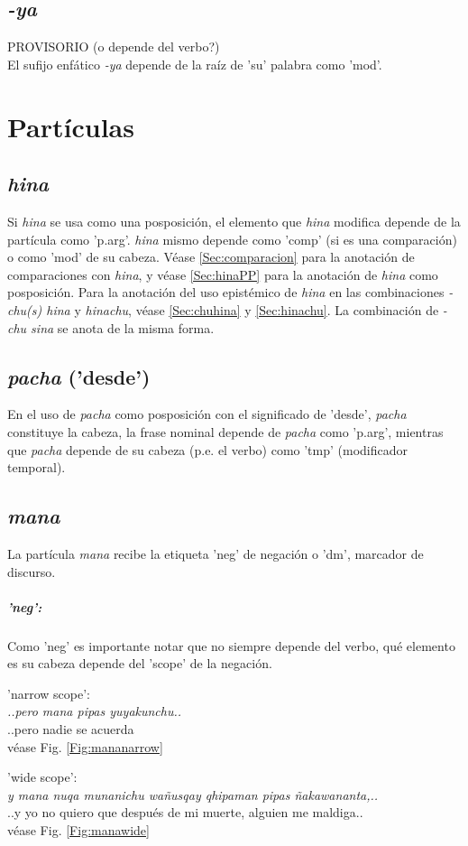 \documentclass[a4paper,11pt,DIV12]{scrartcl}
\begin{document}
  \subsection{{\em -ya}}
PROVISORIO (o depende del verbo?)\\
El sufijo enf\'atico {\em -ya} depende de la ra\'iz de 'su' palabra como 'mod'.

  
\section{Part\'iculas}
  \subsection{{\em hina}}\label{Sec:particulahina} Si {\em hina} se usa como una posposici\'on, el elemento que {\em hina} modifica depende de la part\'icula como 'p.arg'. {\em hina} mismo depende como 'comp' (si es una comparaci\'on) o como 'mod' de su cabeza. V\'ease \ref{Sec:comparacion} para la anotaci\'on de comparaciones con {\em hina}, y v\'ease \ref{Sec:hinaPP} para la anotaci\'on de {\em hina} como posposici\'on. Para la anotaci\'on del uso epist\'emico de {\em hina} en las combinaciones {\em -chu(s) hina} y {\em hinachu}, v\'ease \ref{Sec:chuhina} y \ref{Sec:hinachu}. La combinaci\'on de {\em -chu sina} se anota de la misma forma.

\subsection{{\em pacha} ('desde')}\label{Sec:particulapacha}

En el uso de {\em pacha} como posposici\'on con el significado de 'desde', {\em pacha} constituye la cabeza, la frase nominal depende de {\em pacha} como 'p.arg', mientras que {\em pacha} depende de su cabeza (p.e. el verbo) como  'tmp' (modificador temporal).

  \subsection{{\em mana}} La part\'icula {\em mana} recibe la etiqueta 'neg' de negaci\'on o 'dm', marcador de discurso. 
\subparagraph{'neg':}
Como 'neg' es importante notar que no siempre depende del verbo, qu\'e elemento es su cabeza depende del 'scope' de la negaci\'on.

\begin{examples}
 \item 'narrow scope':\\
	{\em ..pero mana pipas yuyakunchu..}\\
      ..pero nadie se acuerda\\
	v\'ease Fig. \ref{Fig:mananarrow}
 \item  'wide scope':\\
	{\em y mana nuqa munanichu wañusqay qhipaman pipas ñakawananta,..}\\
	..y yo no quiero que después de mi muerte, alguien me maldiga..\\
	v\'ease Fig. \ref{Fig:manawide}\\
 	\hfill{\small \citep{Valderrama77}}	
\end{examples}
\end{document}
